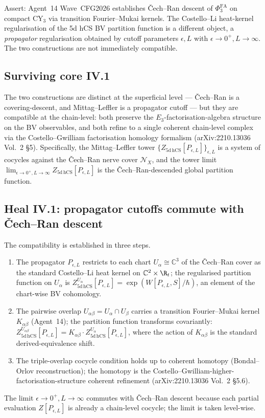 Assert: Agent~14 Wave~CFG2026 establishes Čech--Ran descent of
$\Phi^{\mathrm{FA}}_3$ on compact CY$_3$ via transition
Fourier--Mukai kernels. The Costello--Li heat-kernel regularisation of
the 5d hCS BV partition function is a different object, a
\emph{propagator} regularisation obtained by cutoff parameters
$\epsilon, L$ with $\epsilon \to 0^+, L \to \infty$. The two
constructions are not immediately compatible.

\subsection*{Surviving core IV.1}

The two constructions are distinct at the superficial level --- Čech--Ran
is a covering-descent, and Mittag--Leffler is a propagator cutoff ---
but they are compatible at the chain-level: both preserve the
$E_3$-factorisation-algebra structure on the BV observables, and
both refine to a single coherent chain-level complex via the
Costello--Gwilliam factorisation homology formalism
(arXiv:2210.13036 Vol.~2 §5). Specifically, the Mittag--Leffler tower
$\{Z_{5\mathrm{d\,hCS}}[P_{\epsilon,L}]\}_{\epsilon, L}$ is a system of
cocycles against the Čech--Ran nerve cover $\mathcal{N}_X$, and the
tower limit $\lim_{\epsilon \to 0^+, L \to \infty}
Z_{5\mathrm{d\,hCS}}[P_{\epsilon,L}]$ is the Čech--Ran-descended
global partition function.

\subsection*{Heal IV.1: propagator cutoffs commute with Čech--Ran
descent}

The compatibility is established in three steps.

\begin{enumerate}[label=\textup{(\roman*)}]
\item The propagator $P_{\epsilon,L}$ restricts to each chart
$U_\alpha \cong \mathbb{C}^3$ of the Čech--Ran cover as the standard
Costello--Li heat kernel on $\mathbb{C}^2 \times \R_t$; the regularised
partition function on $U_\alpha$ is
$Z^{U_\alpha}_{5\mathrm{d\,hCS}}[P_{\epsilon,L}] =
\exp(W[P_{\epsilon,L}, S] / \hbar)$, an element of the chart-wise
BV cohomology.
\item The pairwise overlap $U_{\alpha\beta} = U_\alpha \cap U_\beta$
carries a transition Fourier--Mukai kernel $K_{\alpha\beta}$
(Agent~14); the partition function transforms covariantly:
$Z^{U_{\alpha\beta}}_{5\mathrm{d\,hCS}}[P_{\epsilon,L}] = K_{\alpha\beta}
\cdot Z^{U_\alpha}_{5\mathrm{d\,hCS}}[P_{\epsilon,L}]$, where the
action of $K_{\alpha\beta}$ is the standard derived-equivalence
shift.
\item The triple-overlap cocycle condition holds up to coherent
homotopy (Bondal--Orlov reconstruction); the homotopy is the
Costello--Gwilliam-higher-factorisation-structure coherent
refinement (arXiv:2210.13036 Vol.~2 §5.6).
\end{enumerate}
The limit $\epsilon \to 0^+, L \to \infty$ commutes with Čech--Ran
descent because each partial evaluation
$Z[P_{\epsilon,L}]$ is already a chain-level cocycle; the limit is
taken level-wise.


